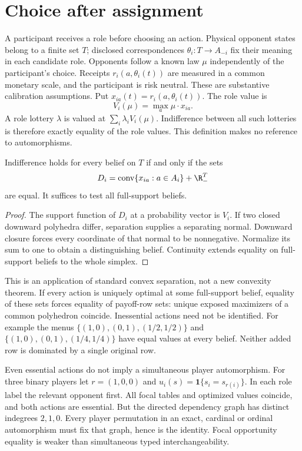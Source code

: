 \section{Choice after assignment}
A participant receives a role before choosing an action. Physical opponent
states belong to a finite set $T$; disclosed correspondences
$\theta_i:T\to A_{-i}$ fix their meaning in each candidate role. Opponents
follow a known law $\mu$ independently of the participant's choice. Receipts
$r_i(a,\theta_i(t))$ are measured in a common monetary scale, and the
participant is risk neutral. These are substantive calibration assumptions.
Put $x_{ia}(t)=r_i(a,\theta_i(t))$. The role value is
\[
 V_i(\mu)=\max_a\mu\cdot x_{ia}.
\]
A role lottery $\lambda$ is valued at $\sum_i\lambda_i V_i(\mu)$.
Indifference between all such lotteries is therefore exactly equality of the
role values. This definition makes no reference to automorphisms.

\begin{theorem}
Indifference holds for every belief on $T$ if and only if the sets
\[
 D_i=\operatorname{conv}\{x_{ia}:a\in A_i\}+\R_{-}^{T}
\]
are equal. It suffices to test all full-support beliefs.
\end{theorem}
\begin{proof}
The support function of $D_i$ at a probability vector is $V_i$.
If two closed downward polyhedra differ, separation supplies a separating
normal. Downward closure forces every coordinate of that normal to be
nonnegative. Normalize its sum to one to obtain a distinguishing belief.
Continuity extends equality on full-support beliefs to the whole simplex.
\end{proof}
This is an application of standard convex separation, not a new convexity
theorem. If every action is uniquely optimal at some full-support belief,
equality of these sets forces equality of payoff-row sets: unique exposed
maximizers of a common polyhedron coincide. Inessential actions need not be
identified. For example the menus
$\{(1,0),(0,1),(1/2,1/2)\}$ and
$\{(1,0),(0,1),(1/4,1/4)\}$ have equal values at every belief.
Neither added row is dominated by a single original row.

Even essential actions do not imply a simultaneous player automorphism.
For three binary players let $r=(1,0,0)$ and
$u_i(s)=\mathbf1\{s_i=s_{r(i)}\}$. In each role label the relevant opponent
first. All focal tables and optimized values coincide, and both actions are
essential. But the directed dependency graph has distinct indegrees $2,1,0$.
Every player permutation in an exact, cardinal or ordinal automorphism must
fix that graph, hence is the identity. Focal opportunity equality is weaker
than simultaneous typed interchangeability.

